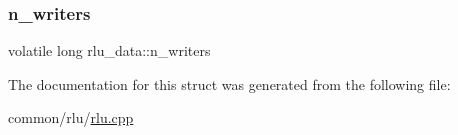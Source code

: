 \subsubsection{\texorpdfstring{n\+\_\+writers}{n\_writers}}
{\footnotesize\ttfamily volatile long rlu\+\_\+data\+::n\+\_\+writers}



The documentation for this struct was generated from the following file\+:\begin{DoxyCompactItemize}
\item 
common/rlu/\hyperlink{rlu_8cpp}{rlu.\+cpp}\end{DoxyCompactItemize}
